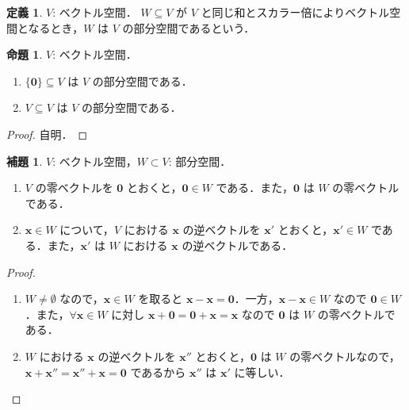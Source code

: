 \documentclass{jlreq}
\theoremstyle{definition}
\newtheorem{dfn}[thm]{定義}
\newtheorem{prop}[thm]{命題}
\newtheorem{lem}[thm]{補題}
\begin{document}
      \begin{dfn}
        $V$: ベクトル空間．
        $W \subseteq V$ が $V$ と同じ和とスカラー倍によりベクトル空間となるとき，$W$ は $V$ の部分空間であるという．
      \end{dfn}
      \begin{prop}
        $V$: ベクトル空間．
        \begin{enumerate}
          \item $\{\bm{0}\} \subseteq V$ は $V$ の部分空間である．
          \item $V \subseteq V$ は $V$ の部分空間である．
        \end{enumerate}
      \end{prop}
      \begin{proof}
        \mbox{}
        自明．
      \end{proof}
      \begin{lem}\label{zero-vector-and-inverse-are-in-subspace}
        $V$: ベクトル空間，$W \subset V$: 部分空間．
        \begin{enumerate}
          \item $V$ の零ベクトルを $\bm{0}$ とおくと，$\bm{0} \in W$ である．また，$\bm{0}$ は $W$ の零ベクトルである．
          \item $\bm{x} \in W$ について，$V$ における $\bm{x}$ の逆ベクトルを $\bm{x}'$ とおくと，$\bm{x}' \in W$ である．また，$\bm{x}'$ は $W$ における $\bm{x}$ の逆ベクトルである．
        \end{enumerate}
      \end{lem}
      \begin{proof}
        \mbox{}
        \begin{enumerate}
          \item $W \neq \emptyset$ なので，$\bm{x} \in W$ を取ると $\bm{x}-\bm{x}=\bm{0}$．一方，$\bm{x}-\bm{x} \in W$ なので $\bm{0} \in W$．また，$\forall \bm{x} \in W$ に対し $\bm{x}+\bm{0}=\bm{0}+\bm{x}=\bm{x}$ なので $\bm{0}$ は $W$ の零ベクトルである．
          \item $W$ における $\bm{x}$ の逆ベクトルを $\bm{x}''$ とおくと，$\bm{0}$ は $W$ の零ベクトルなので，$\bm{x}+\bm{x}''=\bm{x}''+\bm{x}=\bm{0}$ であるから $\bm{x}''$ は $\bm{x}'$ に等しい．
        \end{enumerate}
      \end{proof}
\end{document}
